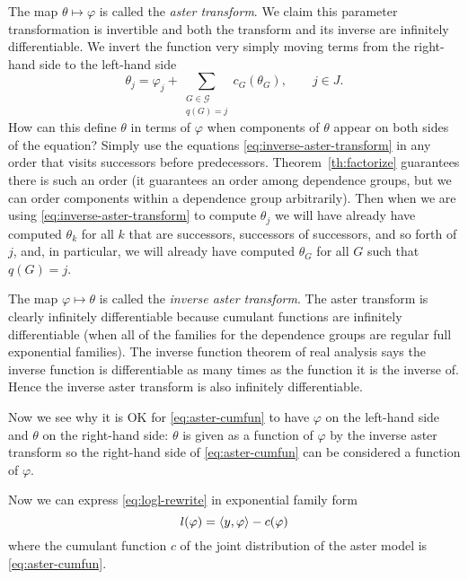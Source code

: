 The map $\theta \mapsto \varphi$ is called the \emph{aster transform}.
We claim this parameter transformation is invertible and both the
transform and its inverse are infinitely differentiable.
We invert the function very simply moving terms from the right-hand
side to the left-hand side
\begin{equation} \label{eq:inverse-aster-transform}
   \theta_j
   =
   \varphi_j + \sum_{\substack{G \in \mathcal{G} \\ q(G) = j}} c_G(\theta_G),
   \qquad j \in J.
\end{equation}
How can this define $\theta$ in terms of $\varphi$ when components of $\theta$
appear on both sides of the equation?
Simply use the equations \eqref{eq:inverse-aster-transform} in any order
that visits successors before predecessors.  Theorem~\ref{th:factorize}
guarantees there is such an order (it guarantees an order among dependence
groups, but we can order components within a dependence group arbitrarily).
Then when we are using \eqref{eq:inverse-aster-transform} to compute
$\theta_j$ we will have already have computed $\theta_k$ for all $k$ that
are successors, successors of successors, and so forth of $j$, and,
in particular, we will already have computed $\theta_G$ for all $G$ such
that $q(G) = j$.

The map $\varphi \mapsto \theta$ is called the \emph{inverse aster transform}.
The aster transform is clearly infinitely differentiable because cumulant
functions are infinitely differentiable (when all of the families for
the dependence groups are regular full exponential families).
The inverse function theorem of real analysis \citep[Theorem~8.27]{browder}
says the inverse function
is differentiable as many times as the function it is the inverse of.
Hence the inverse aster transform is also infinitely differentiable.

Now we see why it is OK for \eqref{eq:aster-cumfun} to have $\varphi$
on the left-hand side and $\theta$ on the right-hand side: $\theta$
is given as a function of $\varphi$ by the inverse aster transform
so the right-hand side of \eqref{eq:aster-cumfun} can be considered
a function of $\varphi$.

Now we can express \eqref{eq:logl-rewrite} in exponential family form
\begin{equation} \label{eq:logl-aster-phi}
   l(\varphi) = \langle y, \varphi \rangle - c(\varphi)
\end{equation}
where the cumulant function $c$ of the joint distribution of the aster
model is \eqref{eq:aster-cumfun}.

